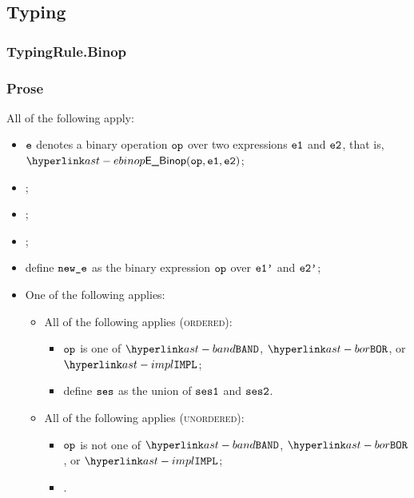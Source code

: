 \subsection{Typing}
\subsubsection{TypingRule.Binop\label{sec:TypingRule.Binop}}
\subsubsection{Prose}
All of the following apply:
\begin{itemize}
  \item $\texttt{e}$ denotes a binary operation $\texttt{op}$ over two expressions $\veone$ and $\vetwo$, that is, \\ $\EBinop(\op, \veone, \vetwo)$;
  \item \Proseannotateexpr{$\tenv$}{$\veone$}{\\ $(\vtone, \veonep, \vsesone)$\ProseOrTypeError};
  \item \Proseannotateexpr{$\tenv$}{$\vetwo$}{\\ $(\vttwo, \vetwop, \vsestwo)$\ProseOrTypeError};
  \item \Proseapplybinoptypes{$\tenv$}{\op}{\vtone}{\vttwo}{$\vt$\ProseOrTypeError};
  \item define $\texttt{new\_e}$ as the binary expression $\texttt{op}$ over $\texttt{e1'}$ and $\texttt{e2'}$;
  \item One of the following applies:
  \begin{itemize}
    \item All of the following applies (\textsc{ordered}):
    \begin{itemize}
      \item $\texttt{op}$ is one of $\BAND$, $\BOR$, or $\IMPL$;
      \item define $\texttt{ses}$ as the union of $\texttt{ses1}$ and $\texttt{ses2}$.
    \end{itemize}

    \item All of the following applies (\textsc{unordered}):
    \begin{itemize}
      \item $\texttt{op}$ is not one of $\BAND$, $\BOR$, or $\IMPL$;
      \item {}.
    \end{itemize}
  \end{itemize}
\end{itemize}
